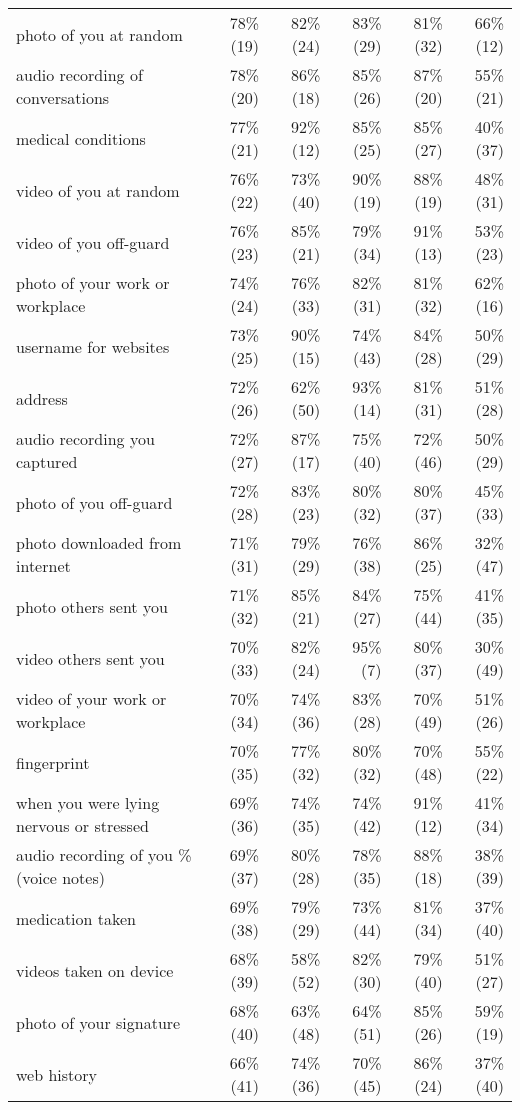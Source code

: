 \begin{table*}[t]
\begin{center}
\begin{tabular}{| l | r | r | r | r | r |}
photo of you at random  & 78\% (19) & 82\% (24) & 83\% (29) & 81\% (32) & 66\% (12) \\ 
audio recording of conversations & 78\% (20) & 86\% (18) & 85\% (26) & 87\% (20) & 55\% (21) \\ 
medical conditions & 77\% (21) & 92\% (12) & 85\% (25) & 85\% (27) & 40\% (37) \\ 
video of you at random & 76\% (22) & 73\% (40) & 90\% (19) & 88\% (19) & 48\% (31) \\ 
video of you off-guard & 76\% (23) & 85\% (21) & 79\% (34) & 91\% (13) & 53\% (23) \\ 
photo of your work or workplace & 74\% (24) & 76\% (33) & 82\% (31) & 81\% (32) & 62\% (16) \\ 
username for websites & 73\% (25) & 90\% (15) & 74\% (43) & 84\% (28) & 50\% (29) \\ 
address & 72\% (26) & 62\% (50) & 93\% (14) & 81\% (31) & 51\% (28) \\ 
audio recording you captured & 72\% (27) & 87\% (17) & 75\% (40) & 72\% (46) & 50\% (29) \\ 
photo of you off-guard & 72\% (28) & 83\% (23) & 80\% (32) & 80\% (37) & 45\% (33) \\ 
photo downloaded from internet & 71\% (31) & 79\% (29) & 76\% (38) & 86\% (25) & 32\% (47) \\ 
photo others sent you & 71\% (32) & 85\% (21) & 84\% (27) & 75\% (44) & 41\% (35) \\ 
video others sent you & 70\% (33) & 82\% (24) & 95\% (7) & 80\% (37) & 30\% (49) \\ 
video of your work or workplace & 70\% (34) & 74\% (36) & 83\% (28) & 70\% (49) & 51\% (26) \\ 
fingerprint & 70\% (35) & 77\% (32) & 80\% (32) & 70\% (48) & 55\% (22) \\ 
when you were lying nervous or stressed & 69\% (36) & 74\% (35) & 74\% (42) & 91\% (12) & 41\% (34) \\ 
audio recording of you \% (voice notes) & 69\% (37) & 80\% (28) & 78\% (35) & 88\% (18) & 38\% (39) \\ 
medication taken & 69\% (38) & 79\% (29) & 73\% (44) & 81\% (34) & 37\% (40) \\ 
videos taken on device & 68\% (39) & 58\% (52) & 82\% (30) & 79\% (40) & 51\% (27) \\ 
photo of your signature & 68\% (40) & 63\% (48) & 64\% (51) & 85\% (26) & 59\% (19) \\ 
web history & 66\% (41) & 74\% (36) & 70\% (45) & 86\% (24) & 37\% (40) \\ 

\end{tabular}
\end{center}
\end{table*}
